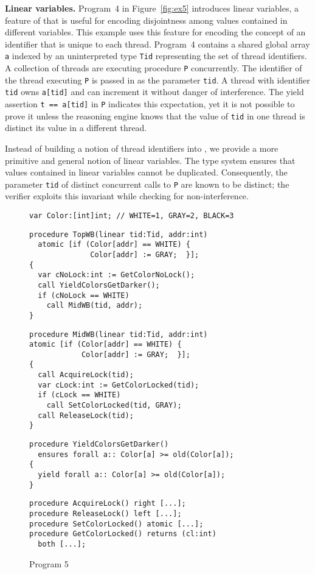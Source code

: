 {\bf Linear variables.}
Program~4 in Figure~\ref{fig:ex5} introduces linear variables, a feature of \civl 
that is useful for encoding disjointness among values contained in 
different variables.  
This example uses this feature for encoding the concept of an identifier 
that is unique to each thread.
Program~4 contains a shared global array {\tt a} indexed by an uninterpreted type {\tt Tid} 
representing the set of thread identifiers.
A collection of threads are executing procedure {\tt P} concurrently.
The identifier of the thread executing {\tt P} is passed in as the parameter {\tt tid}.
A thread with identifier {\tt tid} owns {\tt a[tid]} and can increment it without danger of interference.
The yield assertion {\tt t == a[tid]} in {\tt P} indicates this expectation, yet it is not possible to prove it 
unless the reasoning engine knows that the value of {\tt tid} in one thread is distinct 
its value in a different thread.

Instead of building a notion of thread identifiers into \civl, we provide a more 
primitive and general notion of linear variables.
The \civl type system ensures that values contained in linear variables cannot be duplicated.
Consequently, the parameter {\tt tid} of distinct concurrent calls to {\tt P} are known to be distinct;
the \civl verifier exploits this invariant while checking for non-interference.

\begin{figure}
\begin{verbatim}
var Color:[int]int; // WHITE=1, GRAY=2, BLACK=3
\end{verbatim}
\begin{verbatim}
procedure TopWB(linear tid:Tid, addr:int)
  atomic [if (Color[addr] == WHITE) { 
              Color[addr] := GRAY;  }];
{
  var cNoLock:int := GetColorNoLock();
  call YieldColorsGetDarker(); 
  if (cNoLock == WHITE) 
    call MidWB(tid, addr);
}
\end{verbatim}
\begin{verbatim}
procedure MidWB(linear tid:Tid, addr:int)
atomic [if (Color[addr] == WHITE) {
            Color[addr] := GRAY;  }];
{
  call AcquireLock(tid);
  var cLock:int := GetColorLocked(tid);
  if (cLock == WHITE) 
    call SetColorLocked(tid, GRAY);
  call ReleaseLock(tid);
}
\end{verbatim}
\begin{verbatim}
procedure YieldColorsGetDarker()
  ensures forall a:: Color[a] >= old(Color[a]);
{
  yield forall a:: Color[a] >= old(Color[a]);
}
\end{verbatim}
\begin{verbatim}
procedure AcquireLock() right [...];
procedure ReleaseLock() left [...];
procedure SetColorLocked() atomic [...];
procedure GetColorLocked() returns (cl:int)
  both [...];
\end{verbatim}
\caption{Program 5}
\label{fig:reft}
\end{figure}

